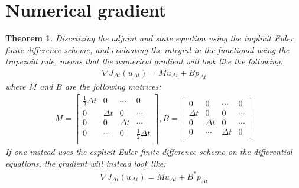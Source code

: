\documentclass[11pt,a4paper]{article}
\newtheorem{theorem}{Theorem}
\begin{document}
\section{Numerical gradient}
\begin{theorem}
Discrtizing the adjoint and state equation using the implicit Euler finite difference scheme, and evaluating the integral in the functional using the trapezoid rule, means that the numerical gradient will look like the following:
\begin{align}
\nabla J_{\Delta t}(u_{\Delta t}) = Mu_{\Delta t} + Bp_{\Delta t} \label{num_grad}
\end{align}
where $M$ and $B$ are the following matrices:
\begin{align*}
M=\left[ \begin{array}{cccc}
   \frac{1}{2}\Delta t & 0 & \cdots & 0 \\  
   0& \Delta t & 0 & \cdots \\ 
   0 &0 & \Delta t  & \cdots \\
   0 &\cdots &0 & \frac{1}{2}\Delta t   \\
   \end{array}  \right] 
,B = \left[ \begin{array}{cccc}
   0& 0 & \cdots & 0 \\  
   \Delta t& 0 & 0 & \cdots \\ 
   0 & \Delta t& 0  & \cdots \\
   0 &\cdots & \Delta t& 0   \\
   \end{array}  \right] 
\end{align*}
If one instead uses the explicit Euler finite difference scheme on the differential equations, the gradient will instead look like:
\begin{align*}
\nabla J_{\Delta t}(u_{\Delta t}) = Mu_{\Delta t} + B^*p_{\Delta t}
\end{align*}
\end{theorem}
\end{document}
